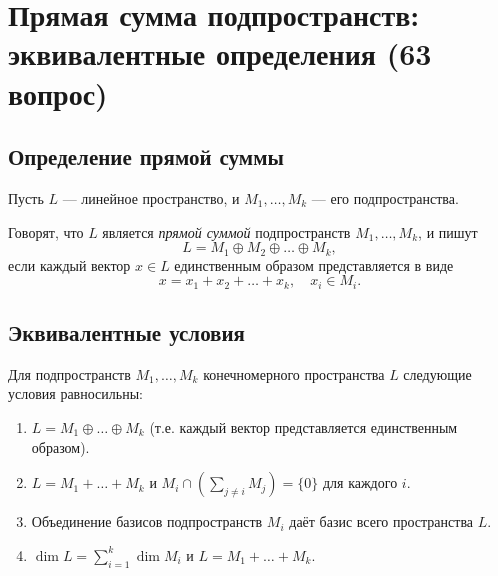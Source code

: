 \documentclass[a4paper,12pt]{article}
\theoremstyle{definition}
\theoremstyle{plain}
\theoremstyle{remark}
\begin{document}
	
	
	
	\newpage
	\section{Прямая сумма подпространств: эквивалентные определения (63 вопрос)}
	
	\subsection{Определение прямой суммы}
	
	Пусть \( L \) — линейное пространство, и \( M_1, \dots, M_k \) — его подпространства.
	
	\begin{tcolorbox}[colback=blue!5, colframe=blue!40!black, title=Определение]
		Говорят, что \( L \) является \textit{прямой суммой} подпространств \( M_1, \dots, M_k \), и пишут
		\[
		L = M_1 \oplus M_2 \oplus \dots \oplus M_k,
		\]
		если каждый вектор \( x \in L \) единственным образом представляется в виде
		\[
		x = x_1 + x_2 + \dots + x_k, \quad x_i \in M_i.
		\]
	\end{tcolorbox}
	
	\subsection{Эквивалентные условия}
	
	\begin{tcolorbox}[colback=green!5, colframe=green!50!black, title=Теорема]
		Для подпространств \( M_1, \dots, M_k \) конечномерного пространства \( L \) следующие условия равносильны:
		\begin{enumerate}
			\item \( L = M_1 \oplus \dots \oplus M_k \) (т.е. каждый вектор представляется единственным образом).
			\item \( L = M_1 + \dots + M_k \) и \( M_i \cap \left( \sum_{j \neq i} M_j \right) = \{0\} \) для каждого \( i \).
			\item Объединение базисов подпространств \( M_i \) даёт базис всего пространства \( L \).
			\item \( \dim L = \sum_{i=1}^k \dim M_i \) и \( L = M_1 + \dots + M_k \).
		\end{enumerate}
	\end{tcolorbox}
	
\end{document}

